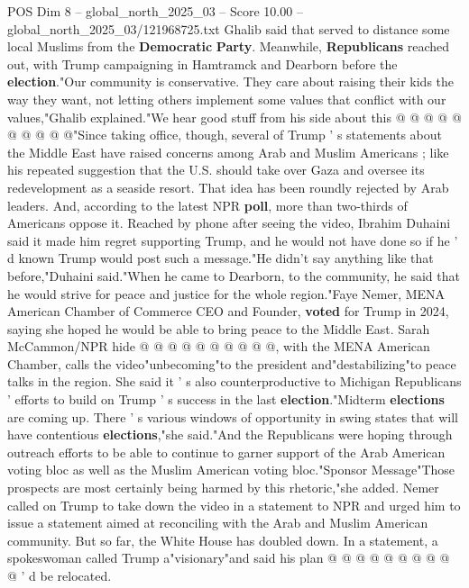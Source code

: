 \begin{textsample}{POS Dim 8 – global\_north\_2025\_03 – Score 10.00 – global\_north\_2025\_03/121968725.txt}
Ghalib said that served to distance some local Muslims from the \textbf{Democratic} \textbf{Party}.
Meanwhile, \textbf{Republicans} reached out, with Trump campaigning in Hamtramck and Dearborn before the \textbf{election}."Our community is conservative.
They care about raising their kids the way they want, not letting others implement some values that conflict with our values,"Ghalib explained."We hear good stuff from his side about this @ @ @ @ @ @ @ @ @ @"Since taking office, though, several of Trump ' s statements about the Middle East have raised concerns among Arab and Muslim Americans ; like his repeated suggestion that the U.S. should take over Gaza and oversee its redevelopment as a seaside resort.
That idea has been roundly rejected by Arab leaders.
And, according to the latest NPR \textbf{poll}, more than two-thirds of Americans oppose it.
Reached by phone after seeing the video, Ibrahim Duhaini said it made him regret supporting Trump, and he would not have done so if he ' d known Trump would post such a message."He didn't say anything like that before,"Duhaini said."When he came to Dearborn, to the community, he said that he would strive for peace and justice for the whole region."Faye Nemer, MENA American Chamber of Commerce CEO and Founder, \textbf{voted} for Trump in 2024, saying she hoped he would be able to bring peace to the Middle East.
Sarah McCammon/NPR hide @ @ @ @ @ @ @ @ @ @, with the MENA American Chamber, calls the video"unbecoming"to the president and"destabilizing"to peace talks in the region.
She said it ' s also counterproductive to Michigan Republicans ' efforts to build on Trump ' s success in the last \textbf{election}."Midterm \textbf{elections} are coming up.
There ' s various windows of opportunity in swing states that will have contentious \textbf{elections},"she said."And the Republicans were hoping through outreach efforts to be able to continue to garner support of the Arab American voting bloc as well as the Muslim American voting bloc."Sponsor Message"Those prospects are most certainly being harmed by this rhetoric,"she added.
Nemer called on Trump to take down the video in a statement to NPR and urged him to issue a statement aimed at reconciling with the Arab and Muslim American community.
But so far, the White House has doubled down.
In a statement, a spokeswoman called Trump a"visionary"and said his plan @ @ @ @ @ @ @ @ @ @ ' d be relocated.

\end{textsample}
